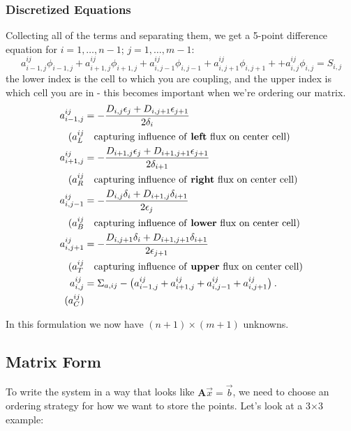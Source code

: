 \documentclass[12pt]{article}
\newcommand{\ve}[1]{\ensuremath{\mathbf{#1}}}
\begin{document}
\subsubsection{Discretized Equations}
Collecting all of the terms and separating them, we get a 5-point difference equation for $i=1,\dots,n-1$; $j=1,\dots,m-1$:
%
\[a_{i-1,j}^{ij}\phi_{i-1,j} + a_{i+1,j}^{ij}\phi_{i+1,j} + a_{i,j-1}^{ij}\phi_{i,j-1} + a_{i,j+1}^{ij}\phi_{i,j+1} + + a_{i,j}^{ij}\phi_{i,j} = S_{i,j} \]
%
the lower index is the cell to which you are coupling, and the upper index is which cell you are in - this becomes important when we're ordering our matrix.
%
\begin{align}
a_{i-1,j}^{ij} &= -\frac{D_{i,j} \epsilon_{j} + D_{i,j+1} \epsilon_{j+1}}{2 \delta_{i}}  \nonumber \\
(a_L^{ij} & \quad \text{capturing influence of \textbf{left} flux on center cell}) \nonumber \\
%
a_{i+1,j}^{ij} &= -\frac{D_{i+1,j} \epsilon_{j} + D_{i+1,j+1} \epsilon_{j+1}}{2 \delta_{i+1}}  \nonumber \\
(a_R^{ij} & \quad \text{capturing influence of \textbf{right} flux on center cell}) \nonumber \\
%
a_{i,j-1}^{ij} &= -\frac{D_{i,j} \delta_{i} + D_{i+1,j} \delta_{i+1}}{2 \epsilon_{j}}  \nonumber \\
(a_B^{ij} & \quad \text{capturing influence of \textbf{lower} flux on center cell}) \nonumber \\
%
a_{i,j+1}^{ij} &= -\frac{D_{i,j+1} \delta_{i} + D_{i+1,j+1} \delta_{i+1}}{2 \epsilon_{j+1}}  \nonumber \\
(a_T^{ij} & \quad \text{capturing influence of \textbf{upper} flux on center cell}) \nonumber \\
%
a_{i,j}^{ij} &= \Sigma_{a,ij} - \bigl(a_{i-1,j}^{ij} + a_{i+1,j}^{ij} + a_{i,j-1}^{ij} + a_{i,j+1}^{ij} \bigr)
 \:.\nonumber \\
 (a_C^{ij}) & \nonumber
\end{align}

In this formulation we now have $(n+1) \times (m+1)$ unknowns. 

\subsection{Matrix Form}
To write the system in a way that looks like $\ve{A}\vec{x} = \vec{b}$, we need to choose an ordering strategy for how we want to store the points. Let's look at a 3$\times$3 example:
\end{document}
